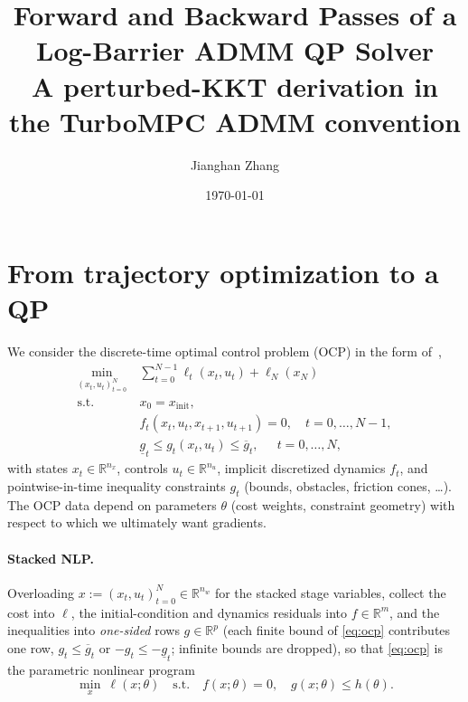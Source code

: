\documentclass[10pt,twocolumn]{article}
\title{Forward and Backward Passes of a Log-Barrier ADMM QP Solver\\
\large A perturbed-KKT derivation in the TurboMPC ADMM convention}
\author{Jianghan Zhang}
\date{\today}
\newcommand{\R}{\mathbb{R}}
\begin{document}
\maketitle

\section{From trajectory optimization to a QP}
\label{sec:trajopt}

We consider the discrete-time optimal control problem (OCP) in the form
of~\cite{turbompc},
\begin{equation}
\label{eq:ocp}
\begin{aligned}
\min_{(x_t,u_t)_{t=0}^{N}}\ & \textstyle\sum_{t=0}^{N-1}\ell_t(x_t,u_t)+\ell_N(x_N)\\
\text{s.t.}\ \ & x_0 = x_{\mathrm{init}},\\
& f_t(x_t,u_t,x_{t+1},u_{t+1}) = 0, \quad t=0,\dots,N{-}1,\\
& \underline g_t \le g_t(x_t,u_t) \le \overline g_t, \quad\ \ t=0,\dots,N,
\end{aligned}
\end{equation}
with states $x_t\in\R^{n_x}$, controls $u_t\in\R^{n_u}$, implicit discretized dynamics
$f_t$, and pointwise-in-time inequality constraints $g_t$ (bounds, obstacles,
friction cones, \dots). The OCP data depend on parameters $\theta$ (cost weights,
constraint geometry) with respect to which we ultimately want gradients.

\paragraph{Stacked NLP.} Overloading $x := (x_t,u_t)_{t=0}^{N}\in\R^{n_w}$ for the
stacked stage variables, collect the cost into $\ell$, the initial-condition and
dynamics residuals into $f\in\R^{m}$, and the inequalities into \emph{one-sided}
rows $g\in\R^{p}$ (each finite bound of \eqref{eq:ocp} contributes one row,
$g_t \le \overline g_t$ or $-g_t \le -\underline g_t$; infinite bounds are dropped),
so that \eqref{eq:ocp} is the parametric nonlinear program
\begin{equation}
\label{eq:nlp}
\min_{x}\ \ell(x;\theta)\quad\text{s.t.}\quad f(x;\theta) = 0,\quad
g(x;\theta) \le h(\theta).
\end{equation}
\end{document}
